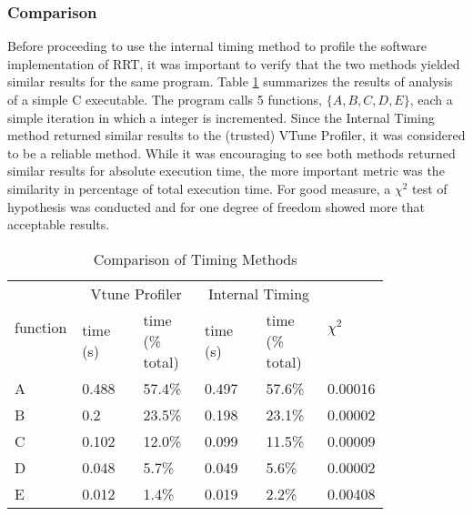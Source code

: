     \subsubsection*{Comparison}
        Before proceeding to use the internal timing method to profile the software implementation of \gls{RRT}, it was important to verify that the two methods yielded similar results for the same program. Table \ref{table:timing_calibration} summarizes the results of analysis of a simple C executable. The program calls 5 functions, $\{A, B, C, D, E\}$, each a simple iteration in which a integer is incremented. Since the Internal Timing method returned similar results to the (trusted) VTune Profiler, it was considered to be a reliable method. While it was encouraging to see both methods returned similar results for absolute execution time, the more important metric was the similarity in percentage of total execution time. For good measure, a $\chi^2$ test of hypothesis was conducted and for one degree of freedom showed more that acceptable results.

        \begin{table}[H]
        \begin{center}
        \begin{tabular}{|m{0.09\linewidth}|m{0.16\linewidth}|m{0.16\linewidth}|m{0.16\linewidth}|m{0.16\linewidth}|m{0.09\linewidth}|}
        \hline
        \multirow{2}{*}{function} & \multicolumn{2}{c|}{Vtune Profiler} & \multicolumn{2}{c|}{Internal Timing}  & \multirow{2}{*}{$\chi^2$}\\
        \cline{2-5}
                    & time (s)  & time (\% total) & time (s) & time (\% total)  &   \\
        \hline
        A       & 0.488     & 57.4\%        & 0.497 & 57.6\%  &  0.00016       \\
        B       & 0.2       & 23.5\%        & 0.198 & 23.1\%  &  0.00002       \\
        C       & 0.102     & 12.0\%        & 0.099 & 11.5\%  &  0.00009       \\
        D       & 0.048     & 5.7\%         & 0.049 & 5.6\%   &  0.00002       \\
        E       & 0.012     & 1.4\%         & 0.019 & 2.2\%   &  0.00408       \\
        \hline
        \end{tabular}
        \end{center}
        \caption{Comparison of Timing Methods}
        \label{table:timing_calibration}
        \end{table}
